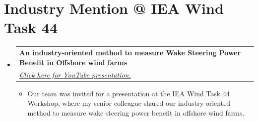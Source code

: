 
\section{Industry Mention @ IEA Wind Task 44}
\vspace{3pt}
\begin{itemize}[leftmargin=0.15in, label={}]

  \vspace{-2pt}\item
    \begin{tabularx}{0.97\textwidth}{@{}X@{}}
      \small\textbf{An industry-oriented method to measure Wake Steering Power Benefit in Offshore wind farms} \\
      \small\emph{\href{https://youtu.be/ZYDxCEC2a0E?si=FYjmkd32PsPj3N2F\&t=32}{\color{blue}Click here for YouTube presentation.}} \\
    \end{tabularx}\vspace{-7pt}
    \begin{itemize}
      \item\small{Our team was invited for a presentation at the IEA Wind Task 44 Workshop, where my senior colleague shared our industry-oriented method to measure wake steering power benefit in offshore wind farms.}
    \end{itemize}\vspace{-5pt}

\end{itemize}
